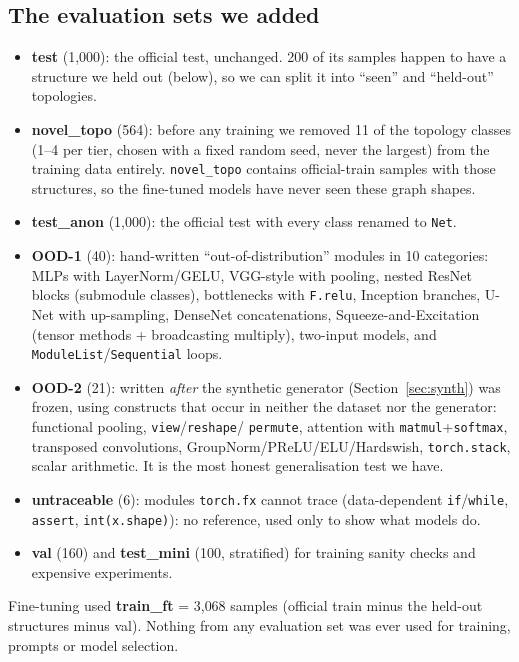 \documentclass[11pt,a4paper]{article}
\begin{document}
\subsection{The evaluation sets we added}
\begin{itemize}[leftmargin=*]
\item \textbf{test} (1{,}000): the official test, unchanged. 200 of its samples happen to have a structure we held out
(below), so we can split it into ``seen'' and ``held-out'' topologies.
\item \textbf{novel\_topo} (564): before any training we removed 11 of the topology classes (1--4 per tier, chosen with a
fixed random seed, never the largest) from the training data entirely. \texttt{novel\_topo} contains official-train
samples with those structures, so the fine-tuned models have never seen these graph shapes.
\item \textbf{test\_anon} (1{,}000): the official test with every class renamed to \texttt{Net}.
\item \textbf{OOD-1} (40): hand-written ``out-of-distribution'' modules in 10 categories: MLPs with LayerNorm/GELU,
VGG-style with pooling, nested ResNet blocks (submodule classes), bottlenecks with \texttt{F.relu}, Inception branches,
U-Net with up-sampling, DenseNet concatenations, Squeeze-and-Excitation (tensor methods + broadcasting multiply),
two-input models, and \texttt{ModuleList}/\texttt{Sequential} loops.
\item \textbf{OOD-2} (21): written \emph{after} the synthetic generator (Section~\ref{sec:synth}) was frozen, using
constructs that occur in neither the dataset nor the generator: functional pooling, \texttt{view}/\texttt{reshape}/
\texttt{permute}, attention with \texttt{matmul}+\texttt{softmax}, transposed convolutions, GroupNorm/PReLU/ELU/Hardswish,
\texttt{torch.stack}, scalar arithmetic. It is the most honest generalisation test we have.
\item \textbf{untraceable} (6): modules \texttt{torch.fx} cannot trace (data-dependent \texttt{if}/\texttt{while},
\texttt{assert}, \texttt{int(x.shape)}): no reference, used only to show what models do.
\item \textbf{val} (160) and \textbf{test\_mini} (100, stratified) for training sanity checks and expensive experiments.
\end{itemize}
Fine-tuning used \textbf{train\_ft} = 3{,}068 samples (official train minus the held-out structures minus val).
Nothing from any evaluation set was ever used for training, prompts or model selection.
\end{document}
